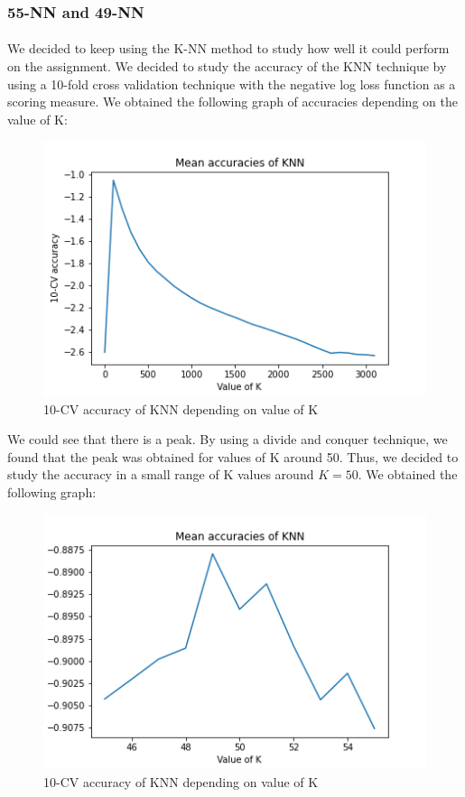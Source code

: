 \documentclass[a4paper, 11pt, oneside]{article}
\begin{document}
\subsubsection{55-NN and 49-NN} \label{subsubsec:55-49-NN}
\paragraph{}We decided to keep using the K-NN method to study how well it could perform on the assignment. We decided to study the accuracy of the KNN technique by using a 10-fold cross validation technique with the negative log loss function as a scoring measure. We obtained the following graph of accuracies depending on the value of K:
\begin{figure}[H]
\center
\includegraphics[scale=0.3]{knn/log_loss.png}
\caption{10-CV accuracy of KNN depending on value of K}
\end{figure}
We could see that there is a peak. By using a divide and conquer technique, we found that the peak was obtained for values of K around 50. Thus, we decided to study the accuracy in a small range of K values around $K=50$. We obtained the following graph:
\begin{figure}[H]
\center
\includegraphics[scale=0.4]{knn/log_loss_focused.png}
\caption{10-CV accuracy of KNN depending on value of K}
\label{fig:knn_log_loss_focused}
\end{figure}
\end{document}
